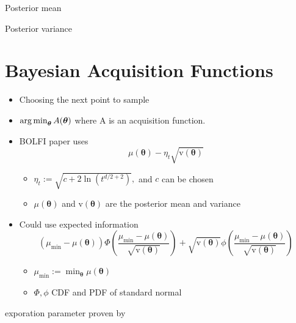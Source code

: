 Posterior mean

Posterior variance

\section{Bayesian Acquisition Functions}

\begin{itemize}
    \item Choosing the next point to sample
    \item $\operatorname*{arg\,min}_{\bm{\theta}}A(\bm\theta)$ where A is an acquisition function.
    \item BOLFI paper uses $$\mu(\bm\theta) - \eta_t\sqrt{\mathrm{v}(\bm\theta)}$$ \begin{itemize}
              \item $\eta_t:= \sqrt{c + 2\ln(t^{d/2 + 2})},$ and $c$ can be chosen
              \item $\mu(\bm\theta)$ and $\mathrm{v}(\bm\theta)$ are the posterior mean and variance
          \end{itemize}

    \item Could use expected information $$(\mu_\text{min} - \mu(\bm\theta))
              \varPhi\left(\frac{\mu_\text{min} - \mu(\bm\theta)}{\sqrt{\mathrm{v}(\bm\theta)}}\right) + \sqrt{\mathrm{v}(\bm\theta)}
              \phi\left(\frac{\mu_\text{min} - \mu(\bm\theta)}{\sqrt{\mathrm{v}(\bm\theta)}}\right)$$\begin{itemize}
              \item $\mu_\text{min} := \min_{\bm{\theta}} \mu(\bm\theta)$
              \item $\varPhi, \phi$ CDF and PDF of standard normal
          \end{itemize}
\end{itemize}

exporation parameter proven by \cite{srinivas_gaussian_2010}